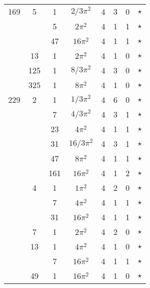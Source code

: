 \documentclass[12pt]{amsart}
\providecommand{\DIFadd}[1]{{\protect\color{blue}\uwave{#1}}} %
\providecommand{\DIFdel}[1]{{\protect\color{red}\sout{#1}}}                      %
\providecommand{\DIFaddbegin}{} %
\providecommand{\DIFaddend}{} %
\providecommand{\DIFdelbegin}{} %
\providecommand{\DIFdelend}{} %
\begin{document}
\begin{tabular}{ccc|ccccc}
169 & 5 & 1 & \DIFdelbegin \DIFdel{$2/3\pi^2$ }\DIFdelend \DIFaddbegin \DIFadd{$(2/3)\pi^2$ }\DIFaddend & 4 & 3 & 0 & $\star$ \\
 &  & 5 & $2\pi^2$ & 4 & 1 & 1 & $\star$ \\
 &  & 47 & $16\pi^2$ & 4 & 1 & 1 & $\star$ \\
 & 13 & 1 & $2\pi^2$ & 4 & 1 & 0 & $\star$ \\
 & 125 & 1 & \DIFdelbegin \DIFdel{$8/3\pi^2$ }\DIFdelend \DIFaddbegin \DIFadd{$(8/3)\pi^2$ }\DIFaddend & 4 & 3 & 0 & $\star$ \\
 & 325 & 1 & $8\pi^2$ & 4 & 1 & 0 & $\star$ \\
229 & 2 & 1 & \DIFdelbegin \DIFdel{$1/3\pi^2$ }\DIFdelend \DIFaddbegin \DIFadd{$(1/3)\pi^2$ }\DIFaddend & 4 & 6 & 0 & $\star$ \\
 &  & 7 & \DIFdelbegin \DIFdel{$4/3\pi^2$ }\DIFdelend \DIFaddbegin \DIFadd{$(4/3)\pi^2$ }\DIFaddend & 4 & 3 & 1 & $\star$ \\
 &  & 23 & $4\pi^2$ & 4 & 1 & 1 & $\star$ \\
 &  & 31 & \DIFdelbegin \DIFdel{$16/3\pi^2$ }\DIFdelend \DIFaddbegin \DIFadd{$(16/3)\pi^2$ }\DIFaddend & 4 & 3 & 1 & $\star$ \\
 &  & 47 & $8\pi^2$ & 4 & 1 & 1 & $\star$ \\
 &  & 161 & $16\pi^2$ & 4 & 1 & 2 & $\star$ \\
 & 4 & 1 & \DIFdelbegin \DIFdel{$1\pi^2$ }\DIFdelend \DIFaddbegin \DIFadd{$\pi^2$ }\DIFaddend & 4 & 2 & 0 & $\star$ \\
 &  & 7 & $4\pi^2$ & 4 & 1 & 1 & $\star$ \\
 &  & 31 & $16\pi^2$ & 4 & 1 & 1 & $\star$ \\
 & 7 & 1 & $2\pi^2$ & 4 & 2 & 0 & $\star$ \\
 & 13 & 1 & $4\pi^2$ & 4 & 1 & 0 & $\star$ \\
 &  & 7 & $16\pi^2$ & 4 & 1 & 1 & $\star$ \\
 & 49 & 1 & $16\pi^2$ & 4 & 1 & 0 & $\star$ 
  \end{tabular}
\end{document}
